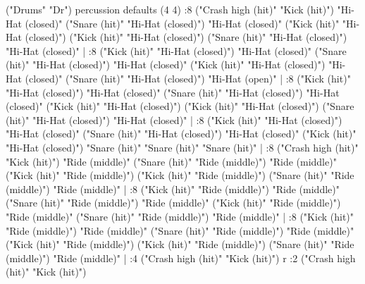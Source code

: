 \track ("Drums" "Dr")
  \instrument percussion
  \articulation defaults
  \ts (4 4)
  :8 ("Crash high (hit)" "Kick (hit)") "Hi-Hat (closed)" ("Snare (hit)" "Hi-Hat (closed)") "Hi-Hat (closed)" ("Kick (hit)" "Hi-Hat (closed)") ("Kick (hit)" "Hi-Hat (closed)") ("Snare (hit)" "Hi-Hat (closed)") "Hi-Hat (closed)" |
  :8 ("Kick (hit)" "Hi-Hat (closed)") "Hi-Hat (closed)" ("Snare (hit)" "Hi-Hat (closed)") "Hi-Hat (closed)" ("Kick (hit)" "Hi-Hat (closed)") "Hi-Hat (closed)" ("Snare (hit)" "Hi-Hat (closed)") "Hi-Hat (open)" |
  :8 ("Kick (hit)" "Hi-Hat (closed)") "Hi-Hat (closed)" ("Snare (hit)" "Hi-Hat (closed)") "Hi-Hat (closed)" ("Kick (hit)" "Hi-Hat (closed)") ("Kick (hit)" "Hi-Hat (closed)") ("Snare (hit)" "Hi-Hat (closed)") "Hi-Hat (closed)" |
  :8 ("Kick (hit)" "Hi-Hat (closed)") "Hi-Hat (closed)" ("Snare (hit)" "Hi-Hat (closed)") "Hi-Hat (closed)" ("Kick (hit)" "Hi-Hat (closed)") "Snare (hit)" "Snare (hit)" "Snare (hit)" |
  :8 ("Crash high (hit)" "Kick (hit)") "Ride (middle)" ("Snare (hit)" "Ride (middle)") "Ride (middle)" ("Kick (hit)" "Ride (middle)") ("Kick (hit)" "Ride (middle)") ("Snare (hit)" "Ride (middle)") "Ride (middle)" |
  :8 ("Kick (hit)" "Ride (middle)") "Ride (middle)" ("Snare (hit)" "Ride (middle)") "Ride (middle)" ("Kick (hit)" "Ride (middle)") "Ride (middle)" ("Snare (hit)" "Ride (middle)") "Ride (middle)" |
  :8 ("Kick (hit)" "Ride (middle)") "Ride (middle)" ("Snare (hit)" "Ride (middle)") "Ride (middle)" ("Kick (hit)" "Ride (middle)") ("Kick (hit)" "Ride (middle)") ("Snare (hit)" "Ride (middle)") "Ride (middle)" |
  :4 ("Crash high (hit)" "Kick (hit)") r :2 ("Crash high (hit)" "Kick (hit)")
